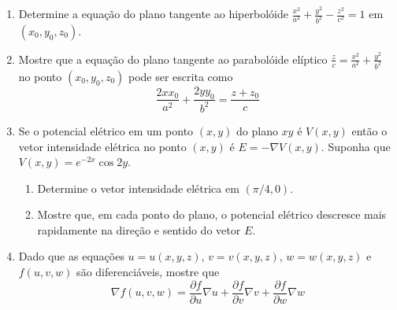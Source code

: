 \documentclass[11pt,a4paper]{article}
\begin{document}
\begin{enumerate}
\begin{enumerate}
	 \end{enumerate}
	 
	\item Determine a equação do plano tangente ao hiperbolóide $\displaystyle\frac{x^2}{a^2} + \displaystyle\frac{y^2}{b^2} - \displaystyle\frac{z^2}{c^2} = 1$ em $(x_0, y_0, z_0)$.
	 	
	 \item Mostre que a equação do plano tangente ao parabolóide elíptico $\displaystyle\frac{z}{c} = \displaystyle\frac{x^2}{a^2} + \displaystyle\frac{y^2}{b^2}$ no ponto $(x_0, y_0, z_0)$ pode ser escrita como
	 	$$\displaystyle\frac{2xx_0}{a^2} + \displaystyle\frac{2yy_0}{b^2} = \displaystyle\frac{z + z_0}{c}$$ 	 
	 
	 \item Se o potencial elétrico em um ponto $(x,y)$ do plano $xy$ é $V(x,y)$ então o vetor intensidade elétrica no ponto $(x,y)$ é $E = -\nabla V (x,y)$. Suponha que $V(x,y) = e^{-2x}\cos 2y$.
	 \begin{enumerate}
	 	\item Determine o vetor intensidade elétrica em $(\pi/4, 0)$.
	 	\item Mostre que, em cada ponto do plano, o potencial elétrico descresce mais rapidamente na direção e sentido do vetor $E$.
	 \end{enumerate}
	 
	 \item Dado que as equações $u = u(x,y,z)$, $v = v(x,y,z)$, $w = w(x,y,z)$ e $f(u,v,w)$ são diferenciáveis, mostre que
	 $$\nabla f(u,v,w) = \dfrac{\partial f}{\partial u} \nabla u + \dfrac{\partial f}{\partial v} \nabla v + \dfrac{\partial f}{\partial w} \nabla w$$
	 
	\end{enumerate}
	
\end{document}
